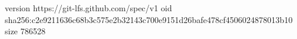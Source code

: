 version https://git-lfs.github.com/spec/v1
oid sha256:c2e9211636c68b3c575e2b32143c700e9151d26bafe478cf4506024878013b10
size 786528
